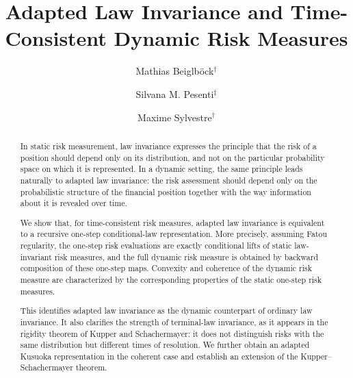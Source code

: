 \documentclass[a4paper]{amsart}
\theoremstyle{definition}
\begin{document}
\begin{abstract} 
In static risk measurement, law invariance expresses the principle that the
risk of a position should depend only on its distribution, and not on the
particular probability space on which it is represented. In a dynamic setting,
the same principle leads naturally to adapted law invariance: the risk
assessment should depend only on the probabilistic structure of the financial position 
together with the way information about it is revealed over time.

We show that, for time-consistent risk measures, adapted law invariance is equivalent to a recursive
one-step conditional-law representation. More precisely, assuming Fatou regularity, the one-step risk
evaluations are exactly conditional lifts of static law-invariant risk
measures, and the full dynamic risk measure is obtained by backward
composition of these one-step maps. Convexity and coherence of the dynamic
risk measure are characterized by the corresponding properties of the static
one-step risk measures.


This identifies adapted law invariance as the dynamic counterpart of ordinary
law invariance. It also clarifies the strength of terminal-law invariance, as it appears in
the rigidity theorem of Kupper and Schachermayer: it
does not distinguish risks with the same distribution but different
times of resolution. 
We further obtain an
adapted Kusuoka representation in the coherent case and establish an extension of the Kupper--Schachermayer theorem.

\end{abstract}


\title{Adapted Law Invariance and Time-Consistent Dynamic Risk Measures}
\author{Mathias Beiglböck$^\dagger$}
\address{$^\dagger$Faculty of Mathematics, University of Vienna, Austria}

\author{Silvana M. Pesenti$^\ddagger$}
\address{$^\ddagger$Department of Statistical Sciences, University of Toronto, Canada}

\author{Maxime Sylvestre$^\dagger$}
\end{document}
